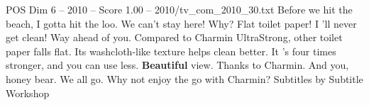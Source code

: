 \begin{textsample}{POS Dim 6 – 2010 – Score 1.00 – 2010/tv\_com\_2010\_30.txt}  \label{ex:f6_pos_064}
Before we hit the beach, I gotta hit the loo.
We can't stay here!
Why?
Flat toilet paper!
I 'll never get clean!
Way ahead of you.
Compared to Charmin UltraStrong, other toilet paper falls flat.
Its washcloth-like texture helps clean better.
It 's four times stronger, and you can use less. \textbf{Beautiful} view.
Thanks to Charmin.
And you, honey bear.
We all go.
Why not enjoy the go with Charmin?
Subtitles by Subtitle Workshop

\end{textsample}

